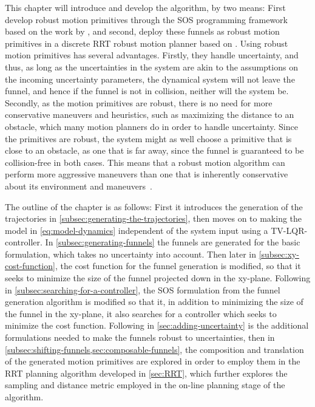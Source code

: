 This chapter will introduce and develop the \rrtfunnel{} algorithm, by two
means: First develop robust motion primitives through the \ac{SOS} programming
framework based on the work by \cite{majumdarFunnelLibrariesRealtime2017},
and second, deploy these funnels as robust motion primitives in a discrete
\ac{RRT} robust motion planner based on \cite{Lav06}. Using robust motion
primitives has several advantages. Firstly, they handle uncertainty, and thus,
as long as the uncertainties in the system are akin to the assumptions on the
incoming uncertainty parameters, the dynamical system will not leave the funnel,
and hence if the funnel is not in collision, neither will the system be.
Secondly, as the motion primitives are robust, there is no need for more
conservative maneuvers and heuristics, such as maximizing the distance to an
obstacle, which many motion planners do in order to handle uncertainty. Since
the primitives are robust, the system might as well choose a primitive that is
close to an obstacle, as one that is far away, since the funnel is guaranteed to
be collision-free in both cases. This means that a robust motion algorithm can
perform more aggressive maneuvers than one that is inherently conservative about
its environment and maneuvers~\cite{singhRobustOnlineMotion2017}.

The outline of the chapter is as follows: First it introduces the generation of
the trajectories in \cref{subsec:generating-the-trajectories}, then moves on to
making the model in \cref{eq:model-dynamics} independent of the system input
using a \ac{TV-LQR}-controller. In \cref{subsec:generating-funnels} the funnels
are generated for the basic formulation, which takes no uncertainty into
account. Then later in \cref{subsec:xy-cost-function}, the cost function for the
funnel generation is modified, so that it seeks to minimize the size of the
funnel projected down in the xy-plane. Following in
\cref{subsec:searching-for-a-controller}, the \ac{SOS} formulation from the
funnel generation algorithm is modified so that it, in addition to minimizing
the size of the funnel in the xy-plane, it also searches for a controller which
seeks to minimize the cost function. Following in \cref{sec:adding-uncertainty}
is the additional formulations needed to make the funnels robust to
uncertainties, then in \cref{subsec:shifting-funnels,sec:composable-funnels},
the composition and translation of the generated motion primitives are explored
in order to employ them in the \ac{RRT} planning algorithm developed in
\cref{sec:RRT}, which further explores the sampling and distance metric employed
in the on-line planning stage of the algorithm.
